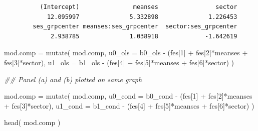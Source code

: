 \documentclass[
  letterpaper,
  DIV=11,
  numbers=noendperiod]{scrreprt}
\newenvironment{Shaded}{}{}
\newcommand{\AttributeTok}[1]{\textcolor[rgb]{0.49,0.56,0.16}{#1}}
\newcommand{\DecValTok}[1]{\textcolor[rgb]{0.25,0.63,0.44}{#1}}
\newcommand{\DocumentationTok}[1]{\textcolor[rgb]{0.73,0.13,0.13}{\textit{#1}}}
\newcommand{\FunctionTok}[1]{\textcolor[rgb]{0.02,0.16,0.49}{#1}}
\newcommand{\NormalTok}[1]{#1}
\newcommand{\OtherTok}[1]{\textcolor[rgb]{0.00,0.44,0.13}{#1}}
\newcommand{\SpecialCharTok}[1]{\textcolor[rgb]{0.25,0.44,0.63}{#1}}
\begin{document}
\begin{verbatim}
          (Intercept)               meanses                sector 
            12.095997              5.332898              1.226453 
        ses_grpcenter meanses:ses_grpcenter  sector:ses_grpcenter 
             2.938785              1.038918             -1.642619 
\end{verbatim}

\begin{Shaded}
\begin{Highlighting}[]
\NormalTok{mod.comp }\OtherTok{=} \FunctionTok{mutate}\NormalTok{( mod.comp,}
                   \AttributeTok{u0\_ols =}\NormalTok{ b0\_ols }\SpecialCharTok{{-}}\NormalTok{ (fes[}\DecValTok{1}\NormalTok{] }\SpecialCharTok{+}\NormalTok{ fes[}\DecValTok{2}\NormalTok{]}\SpecialCharTok{*}\NormalTok{meanses }\SpecialCharTok{+}\NormalTok{ fes[}\DecValTok{3}\NormalTok{]}\SpecialCharTok{*}\NormalTok{sector),}
                   \AttributeTok{u1\_ols =}\NormalTok{ b1\_ols }\SpecialCharTok{{-}}\NormalTok{ (fes[}\DecValTok{4}\NormalTok{] }\SpecialCharTok{+}\NormalTok{ fes[}\DecValTok{5}\NormalTok{]}\SpecialCharTok{*}\NormalTok{meanses }\SpecialCharTok{+}\NormalTok{ fes[}\DecValTok{6}\NormalTok{]}\SpecialCharTok{*}\NormalTok{sector)  )}


\DocumentationTok{\#\# Panel (a) and (b) plotted on same graph}

\NormalTok{mod.comp }\OtherTok{=} \FunctionTok{mutate}\NormalTok{( mod.comp, }
                   \AttributeTok{u0\_cond =}\NormalTok{ b0\_cond }\SpecialCharTok{{-}}\NormalTok{ (fes[}\DecValTok{1}\NormalTok{] }\SpecialCharTok{+}\NormalTok{ fes[}\DecValTok{2}\NormalTok{]}\SpecialCharTok{*}\NormalTok{meanses }\SpecialCharTok{+}\NormalTok{ fes[}\DecValTok{3}\NormalTok{]}\SpecialCharTok{*}\NormalTok{sector),}
                   \AttributeTok{u1\_cond =}\NormalTok{ b1\_cond }\SpecialCharTok{{-}}\NormalTok{ (fes[}\DecValTok{4}\NormalTok{] }\SpecialCharTok{+}\NormalTok{ fes[}\DecValTok{5}\NormalTok{]}\SpecialCharTok{*}\NormalTok{meanses }\SpecialCharTok{+}\NormalTok{ fes[}\DecValTok{6}\NormalTok{]}\SpecialCharTok{*}\NormalTok{sector)  )}

\FunctionTok{head}\NormalTok{( mod.comp )}
\end{Highlighting}
\end{Shaded}
\end{document}
